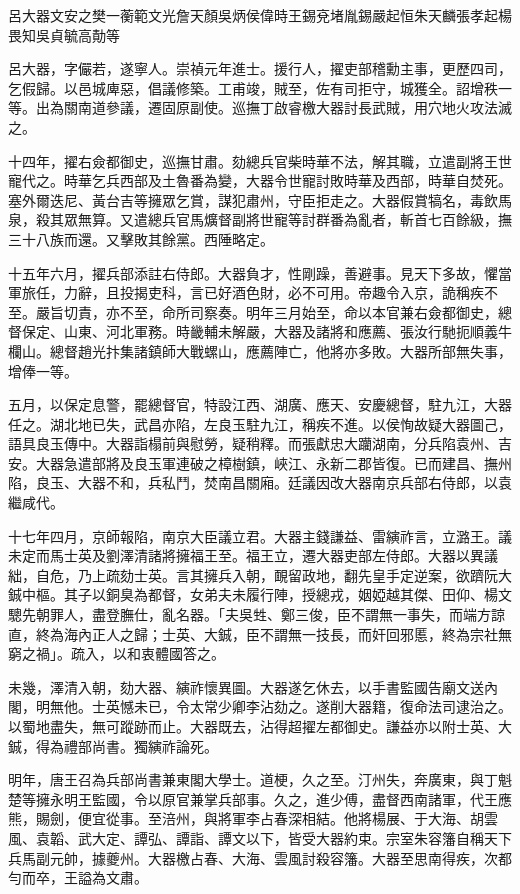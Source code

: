 
\begin{pinyinscope}
呂大器文安之樊一蘅範文光詹天顏吳炳侯偉時王錫兗堵胤錫嚴起恒朱天麟張孝起楊畏知吳貞毓高勣等

呂大器，字儼若，遂寧人。崇禎元年進士。援行人，擢吏部稽勳主事，更歷四司，乞假歸。以邑城庳惡，倡議修築。工甫竣，賊至，佐有司拒守，城獲全。詔增秩一等。出為關南道參議，遷固原副使。巡撫丁啟睿檄大器討長武賊，用穴地火攻法滅之。

十四年，擢右僉都御史，巡撫甘肅。劾總兵官柴時華不法，解其職，立遣副將王世寵代之。時華乞兵西部及土魯番為變，大器令世寵討敗時華及西部，時華自焚死。塞外爾迭尼、黃台吉等擁眾乞賞，謀犯肅州，守臣拒走之。大器假賞犒名，毒飲馬泉，殺其眾無算。又遣總兵官馬爌督副將世寵等討群番為亂者，斬首七百餘級，撫三十八族而還。又擊敗其餘黨。西陲略定。

十五年六月，擢兵部添註右侍郎。大器負才，性剛躁，善避事。見天下多故，懼當軍旅任，力辭，且投揭吏科，言已好酒色財，必不可用。帝趣令入京，詭稱疾不至。嚴旨切責，亦不至，命所司察奏。明年三月始至，命以本官兼右僉都御史，總督保定、山東、河北軍務。時畿輔未解嚴，大器及諸將和應薦、張汝行馳扼順義牛欄山。總督趙光抃集諸鎮師大戰螺山，應薦陣亡，他將亦多敗。大器所部無失事，增俸一等。

五月，以保定息警，罷總督官，特設江西、湖廣、應天、安慶總督，駐九江，大器任之。湖北地已失，武昌亦陷，左良玉駐九江，稱疾不進。以侯恂故疑大器圖己，語具良玉傳中。大器詣榻前與慰勞，疑稍釋。而張獻忠大躪湖南，分兵陷袁州、吉安。大器急遣部將及良玉軍連破之樟樹鎮，峽江、永新二郡皆復。已而建昌、撫州陷，良玉、大器不和，兵私鬥，焚南昌關廂。廷議因改大器南京兵部右侍郎，以袁繼咸代。

十七年四月，京師報陷，南京大臣議立君。大器主錢謙益、雷縯祚言，立潞王。議未定而馬士英及劉澤清諸將擁福王至。福王立，遷大器吏部左侍郎。大器以異議絀，自危，乃上疏劾士英。言其擁兵入朝，靦留政地，翻先皇手定逆案，欲躋阮大鋮中樞。其子以銅臭為都督，女弟夫未履行陣，授總戎，姻婭越其傑、田仰、楊文驄先朝罪人，盡登膴仕，亂名器。「夫吳甡、鄭三俊，臣不謂無一事失，而端方諒直，終為海內正人之歸；士英、大鋮，臣不謂無一技長，而奸回邪慝，終為宗社無窮之禍」。疏入，以和衷體國答之。

未幾，澤清入朝，劾大器、縯祚懷異圖。大器遂乞休去，以手書監國告廟文送內閣，明無他。士英憾未已，令太常少卿李沾劾之。遂削大器籍，復命法司逮治之。以蜀地盡失，無可蹤跡而止。大器既去，沾得超擢左都御史。謙益亦以附士英、大鋮，得為禮部尚書。獨縯祚論死。

明年，唐王召為兵部尚書兼東閣大學士。道梗，久之至。汀州失，奔廣東，與丁魁楚等擁永明王監國，令以原官兼掌兵部事。久之，進少傅，盡督西南諸軍，代王應熊，賜劍，便宜從事。至涪州，與將軍李占春深相結。他將楊展、于大海、胡雲風、袁韜、武大定、譚弘、譚詣、譚文以下，皆受大器約束。宗室朱容籓自稱天下兵馬副元帥，據夔州。大器檄占春、大海、雲風討殺容籓。大器至思南得疾，次都勻而卒，王謚為文肅。


\end{pinyinscope}
